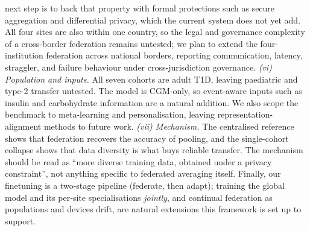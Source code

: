 \documentclass[10pt,letterpaper]{article}
\begin{document}
next step is to back that property with formal protections such as secure
aggregation and differential privacy, which the current system does not yet
add. All four sites are also within one country, so the legal and governance
complexity of a cross-border federation remains untested; we plan to extend the
four-institution federation across national borders, reporting communication,
latency, straggler, and failure behaviour under cross-jurisdiction governance.
\emph{(vi) Population and inputs.} All seven cohorts are adult T1D, leaving
paediatric and type-2 transfer untested. The model is CGM-only, so event-aware
inputs such as insulin and carbohydrate information are a natural addition. We
also scope the benchmark to meta-learning and personalisation, leaving
representation-alignment methods to future work.
\emph{(vii) Mechanism.} The centralised reference shows that federation
recovers the accuracy of pooling, and the single-cohort collapse shows that
data diversity is what buys reliable transfer. The mechanism should be read
as ``more diverse training data, obtained under a privacy constraint'', not
anything specific to federated averaging itself.
Finally, our finetuning is a two-stage pipeline (federate, then adapt);
training the global model and its per-site specialisations \emph{jointly}, and
continual federation as populations and devices drift, are natural extensions
this framework is set up to support.



\end{document}
